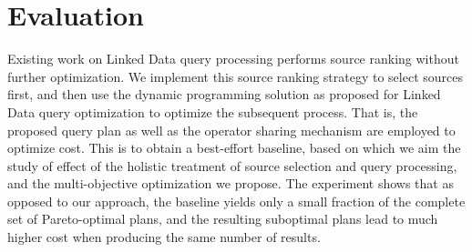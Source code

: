 \section{Evaluation}
\label{sec:eva}
Existing work on Linked Data query processing performs source ranking
without further optimization. We implement this source ranking
strategy to select sources first, and then use the dynamic programming
solution as proposed for Linked Data query optimization to optimize
the subsequent process. That is, the proposed query plan as well as
the operator sharing mechanism are employed to optimize cost. This is
to obtain a best-effort baseline, based on which we aim the study of
effect of the holistic treatment of source selection and query
processing, and the multi-objective optimization we propose. The
experiment shows that as opposed to our approach, the baseline yields
only a small fraction of the complete set of Pareto-optimal plans, and
the resulting suboptimal plans lead to much higher cost when producing
the same number of results.










